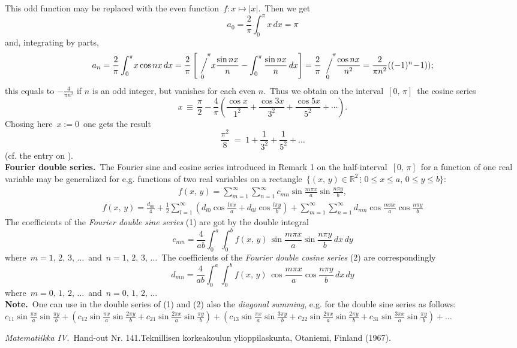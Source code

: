 \documentclass[12pt]{article}
\newcommand{\sijoitus}[2]%
{\operatornamewithlimits{\Big/}_{\!\!\!#1}^{\,#2}}
\theoremstyle{definition}
\begin{document}
This odd function may be replaced with the even function\, $f: x\mapsto |x|$.\, Then we get
 $$a_0 = \frac{2}{\pi}\int_0^\pi x\,dx = \pi$$
and, integrating by parts,
 $$a_n = \frac{2}{\pi}\int_0^\pi\!x\cos{nx}\,dx 
= \frac{2}{\pi}\left[\sijoitus{0}{\quad\pi}\!x\frac{\sin{nx}}{n}
                   -\int_0^\pi \frac{\sin{nx}}{n}\,dx\right] 
= \frac{2}{\pi}\sijoitus{0}{\quad\pi}\!\frac{\cos{nx}}{n^2}
= \frac{2}{\pi n^2}((-1)^n\!-\!1));$$
this equals to $\displaystyle-\frac{4}{\pi n^2}$ if $n$ is an odd integer, but vanishes for each even $n$.\, Thus we obtain on the interval\, $[0,\,\pi]$\, the cosine series
$$x \,\equiv\, 
\frac{\pi}{2}\!-\!\frac{4}{\pi}\!\left(\frac{\cos{x}}{1^2}\!+\!\frac{\cos{3x}}{3^2}
          \!+\!\frac{\cos{5x}}{5^2}\!+\cdots\right).$$
Chosing here\, $x := 0$\, one gets the result
$$\frac{\pi^2}{8} \;=\; 1+\frac{1}{3^2}+\frac{1}{5^2}+\ldots$$
(cf. the entry on ).\\


\textbf{Fourier double series.}\, The Fourier sine and cosine series introduced in Remark 1 on the half-interval\, $[0,\,\pi]$\, for a function of one real variable may be generalized for e.g. functions of two real variables on a rectangle\, $\{(x,\,y)\in \mathbb{R}^2\,\vdots\,\, 0\le x \le a,\,0\le y \le b\}$:
\begin{align}
f(x,\,y) = \sum_{m=1}^\infty\sum_{n=1}^\infty c_{mn}\sin\frac{m\pi x}{a}
\sin\frac{n\pi y}{b},
\end{align}
\begin{align}
f(x,\,y) = \frac{d_{00}}{4}+\frac{1}{2}\sum_{l=1}^\infty \left(d_{l0}\cos\frac{l\pi x}{a}+d_{0l}\cos\frac{l\pi y}{b}\right)+
\sum_{m=1}^\infty\sum_{n=1}^\infty d_{mn}\cos\frac{m\pi x}{a}
\cos\frac{n\pi y}{b}
\end{align}
The coefficients of the {\em Fourier double sine series} (1) are got by the double integral
$$c_{mn} = \frac{4}{ab}
\int_0^a\int_0^b f(x,\,y)\,\sin\frac{m\pi x}{a}\sin\frac{n\pi y}{b}\,dx\,dy$$
where\, $m = 1,\,2,\,3,\,\ldots$\, and\, $n = 1,\,2,\,3,\,\ldots$\, The coefficients of the {\em Fourier double cosine series} (2) are correspondingly
$$d_{mn} = \frac{4}{ab}
\int_0^a\int_0^b f(x,\,y)\,\cos\frac{m\pi x}{a}\cos\frac{n\pi y}{b}\,dx\,dy$$
where\, $m = 0,\,1,\,2,\,\ldots$\, and\, $n = 0,\,1,\,2,\,\ldots$\\

\textbf{Note.}\, One can use in the double series of (1) and (2) also the {\em diagonal summing}, e.g. for the double sine series as follows:\\
$c_{11}\sin\!\frac{\pi x}{a}\sin\!\frac{\pi y}{b}\!+\!
\left(c_{12}\sin\!\frac{\pi x}{a}\sin\!\frac{2\pi y}{b}\!+\!
      c_{21}\sin\!\frac{2\pi x}{a}\sin\!\frac{\pi y}{b}\right)\!+\!
\left(c_{13}\sin\!\frac{\pi x}{a}\sin\!\frac{3\pi y}{b}\!+\!
      c_{22}\sin\!\frac{2\pi x}{a}\sin\!\frac{2\pi y}{b}\!+\!
      c_{31}\sin\!\frac{3\pi x}{a}\sin\!\frac{\pi y}{b}\right)\!+\ldots$

\begin{thebibliography}{9}
 {\em Matematiikka IV}.\, Hand-out Nr. 141.\quad Teknillisen korkeakoulun ylioppilaskunta, Otaniemi, Finland (1967).
\end{thebibliography}
\end{document}
